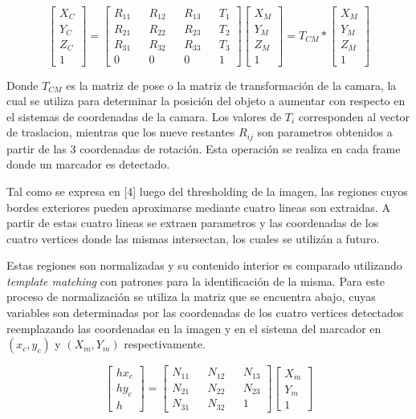 \documentclass[runningheads]{llncs}
\begin{document}
	\[
	\begin{bmatrix}
	X_{C} \\
	Y_{C} \\
	Z_{C} \\
	1
	\end{bmatrix} =
	\begin{bmatrix}
	R_{11} && R_{12} && R_{13} && T_{1} \\
	R_{21} && R_{22} && R_{23} && T_{2} \\
	R_{31} && R_{32} && R_{33} && T_{3} \\
	0 && 0 && 0 && 1
	\end{bmatrix}
	\begin{bmatrix}
	X_{M} \\
	Y_{M} \\
	Z_{M} \\
	1
	\end{bmatrix} = 
	T_{CM} * \begin{bmatrix}
	X_{M} \\
	Y_{M} \\
	Z_{M} \\
	1
	\end{bmatrix}
	\]
	
	Donde $ T_{CM} $ es la matriz de pose o la matriz de transformación de la camara, la cual se utiliza para determinar la posición del objeto a aumentar con respecto en el sistemas de coordenadas de la camara. Los valores de $T_{i}$ corresponden al vector de traslacion, mientras que los nueve restantes $R_{ij}$ son parametros obtenidos a partir de las 3 coordenadas de rotación.
	Esta operación se realiza en cada frame donde un marcador es detectado.
	
	Tal como se expresa en [4] luego del thresholding de la imagen, las regiones cuyos bordes exteriores pueden aproximarse mediante cuatro lineas son extraidas. A partir de estas cuatro lineas se extraen parametros y las coordenadas de los cuatro vertices donde las mismas intersectan, los cuales se utilizán a futuro.
	
	Estas regiones son normalizadas y su contenido interior es comparado utilizando \textit{template matching} con patrones para la identificación de la misma. Para este proceso de normalización se utiliza la matriz que se encuentra abajo, cuyas variables son determinadas por las coordenadas de los cuatro vertices detectados reemplazando las coordenadas en la imagen y en el sistema del marcador en $(x_{c},y_{c})$ y $(X_m,Y_m)$ respectivamente.
	
	\[
	\begin{bmatrix}
	hx_{c} \\
	hy_{c} \\
	h 
	\end{bmatrix} =
	\begin{bmatrix}
	N_{11} && N_{12} && N_{13}\\ 
	N_{21} && N_{22} && N_{23}\\
	N_{31} && N_{32} && 1
	\end{bmatrix} 
	\begin{bmatrix}
	X_{m} \\
	Y_{m} \\
	1
	\end{bmatrix}
	\]
	
\end{document}
